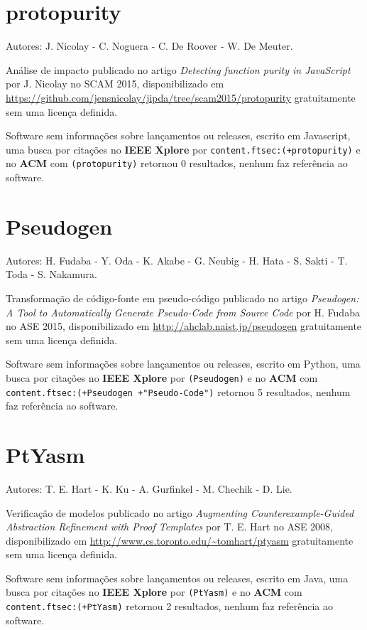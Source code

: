 \section{protopurity}

Autores:
J. Nicolay - C. Noguera - C. De Roover - W. De Meuter.

Análise de impacto
publicado no artigo {\it Detecting function purity in JavaScript}
por J. Nicolay
no SCAM 2015,
disponibilizado em \url{https://github.com/jensnicolay/jipda/tree/scam2015/protopurity}
gratuitamente
sem uma licença definida.

Software sem informações sobre lançamentos ou releases,
escrito em Javascript,
uma busca por citações no {\bf IEEE Xplore} por
\texttt{content.ftsec:(+protopurity)}
e no {\bf ACM} com
\texttt{(protopurity)}
retornou
0 resultados,
nenhum faz referência ao software.


\section{Pseudogen}

Autores:
H. Fudaba - Y. Oda - K. Akabe - G. Neubig - H. Hata - S. Sakti - T. Toda - S. Nakamura.

Transformação de código-fonte em pseudo-código
publicado no artigo {\it Pseudogen: A Tool to Automatically Generate Pseudo-Code from Source Code}
por H. Fudaba
no ASE 2015,
disponibilizado em \url{http://ahclab.naist.jp/pseudogen}
gratuitamente
sem uma licença definida.

Software sem informações sobre lançamentos ou releases,
escrito em Python,
uma busca por citações no {\bf IEEE Xplore} por
\texttt{(Pseudogen)}
e no {\bf ACM} com
\texttt{content.ftsec:(+Pseudogen +"Pseudo-Code")}
retornou
5 resultados,
nenhum faz referência ao software.


\section{PtYasm}

Autores:
T. E. Hart - K. Ku - A. Gurfinkel - M. Chechik - D. Lie.

Verificação de modelos
publicado no artigo {\it Augmenting Counterexample-Guided Abstraction Refinement with Proof Templates}
por T. E. Hart
no ASE 2008,
disponibilizado em \url{http://www.cs.toronto.edu/~tomhart/ptyasm}
gratuitamente
sem uma licença definida.

Software sem informações sobre lançamentos ou releases,
escrito em Java,
uma busca por citações no {\bf IEEE Xplore} por
\texttt{(PtYasm)}
e no {\bf ACM} com
\texttt{content.ftsec:(+PtYasm)}
retornou
2 resultados,
nenhum faz referência ao software.


